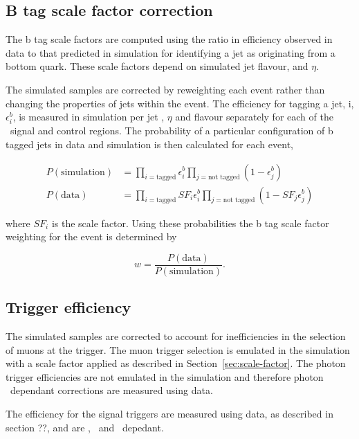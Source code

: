 \subsection{B tag scale factor correction}

The b tag scale factors are computed using the ratio in efficiency observed in data
to that predicted in simulation for identifying a jet as originating from a bottom
quark. These scale factors depend on simulated jet flavour, \pt and $\eta$. 

The simulated samples are corrected by reweighting
each event rather than changing the properties of jets within the event. 
The efficiency for tagging a jet, i, $\epsilon_{i}^{b}$, is measured in simulation per 
jet \pt, $\eta$ and flavour separately for each of the 
\alphat~signal and control regions. The probability of a particular configuration 
of b tagged jets in data and simulation is then calculated for each event,

\begin{align}
P(\text{simulation}) &= \prod_{i=\text{tagged}} \epsilon^{b}_{i} \prod_{j=\text{not tagged}} (1-\epsilon^{b}_{j})\\
P(\text{data}) &= \prod_{i=\text{tagged}} SF_{i}\epsilon^{b}_{i} \prod_{j=\text{not tagged}} (1-SF_{j}\epsilon^{b}_{j})
\end{align}

where $SF_{i}$ is the scale factor. Using these probabilities the b tag scale factor weighting for the event is 
determined by

\begin{equation}
w = \frac{P(\text{data})}{P(\text{simulation})}.
\end{equation}

\subsection{Trigger efficiency}

The simulated samples are corrected to account for inefficiencies in the selection of muons
at the trigger. The muon trigger selection is emulated in the simulation with a scale factor
applied as described in Section~\ref{sec:scale-factor}. The photon trigger efficiencies
are not emulated in the simulation and therefore photon \pt~dependant corrections are measured 
using data. 

The efficiency for the signal triggers are measured using data, as described 
in section ??, and are \scalht, \njet~and \mht~depedant.

